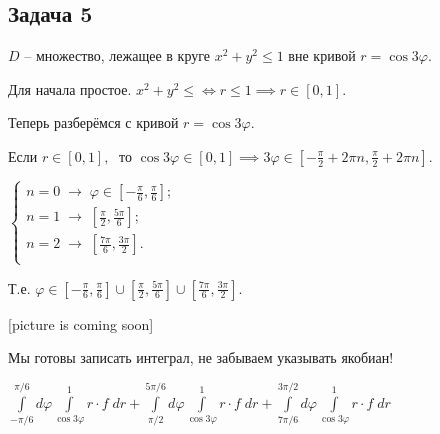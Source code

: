 \documentclass[a4paper, fleqn]{article}
\begin{document}
    \subsection*{Задача 5}
    
    $D$ -- множество, лежащее в круге $x^2 + y^2 \leq 1$ вне кривой $r = \cos 3 \varphi.$
    
    
    Для начала простое. $x^2 + y^2 \leq \iff r \leq 1 \implies r \in [0,1].$
    
    Теперь разберёмся с кривой $r  = \cos 3 \varphi$.
    
    Если $r \in [0,1], \; $ то $\cos 3 \varphi \in [0,1] \implies 3 \varphi \in \left[ -\frac{\pi}{2} + 2\pi n, \frac{\pi}{2} + 2\pi n \right].$
    
    \doublespacing $\begin{cases}
    n = 0 \; \to \; \varphi \in \left[ -\frac{\pi}{6},  \frac{\pi}{6} \right];\\
    n = 1\; \to \; \left[\frac{\pi}{2},  \frac{5\pi}{6} \right]; \\
    n = 2\; \to \;  \left[ \frac{7\pi}{6},  \frac{3\pi}{2} \right]. \\
    \end{cases}$
    
    Т.е. $\varphi \in  \left[ -\frac{\pi}{6},  \frac{\pi}{6} \right] \cup \left[\frac{\pi}{2},  \frac{5\pi}{6} \right]\cup \left[ \frac{7\pi}{6},  \frac{3\pi}{2} \right].$
    
    [picture is coming soon]
    
    \singlespacing Мы готовы записать интеграл, не забываем указывать якобиан!
    
    $\boxed{ \displaystyle \int\limits_{-\pi/6}^{\pi/6} d \varphi \int\limits_{\cos 3 \varphi}^{1} r \cdot f \; dr + \int\limits_{\pi/2}^{5\pi/6} d \varphi \int\limits_{\cos 3 \varphi}^{1} r \cdot f \; dr + 
    \int\limits_{7\pi/6}^{3\pi/2} d \varphi \int\limits_{\cos 3 \varphi}^{1} r \cdot f \; dr} \; $
    
    
\end{document}
